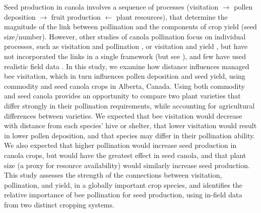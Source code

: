 \documentclass[12pt]{article} %
\begin{document}

Seed production in canola involves a sequence of processes (visitation $\rightarrow$ pollen deposition $\rightarrow$ fruit production $\leftarrow$ plant resources), that determine the magnitude of the link between pollination and the components of crop yield (seed size/number).
However, other studies of canola pollination focus on individual processes, such as visitation and pollination \citep{cresswell1999, thomson2001}, or visitation and yield \citep{steffan2003, manning2005, hudewenz2013}, but have not incorporated the links in a single framework (but see \citealp{saez2018}), and few have used realistic field data \citep{morandin2005, isaacs2010}.
In this study, we examine how distance influences managed bee visitation, which in turn influences pollen deposition and seed yield, using commodity and seed canola crops in Alberta, Canada.
Using both commodity and seed canola provides an opportunity to compare two plant varieties that differ strongly in their pollination requirements, while accounting for agricultural differences between varieties.
We expected that bee visitation would decrease with distance from each species' hive or shelter, that lower visitation would result in lower pollen deposition, and that species may differ in their pollination ability.
We also expected that higher pollination would increase seed production in canola crops, but would have the greatest effect in seed canola, and that plant size (a proxy for resource availability) would similarly increase seed production.
This study assesses the strength of the connections between visitation, pollination, and yield, in a globally important crop species, and identifies the relative importance of bee pollination for seed production, using in-field data from two distinct cropping systems.
\end{document}
